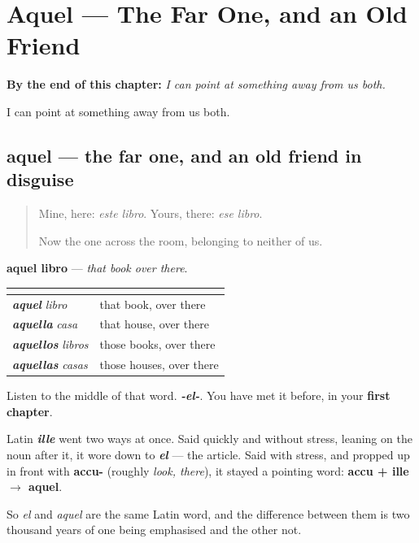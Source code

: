 
\chapter{Aquel --- The Far One, and an Old Friend}
\label{ch:aquel}

\begin{chapteropening}
\textbf{By the end of this chapter:} \emph{I can point at something away from us both.}

I can point at something away from us both.
\end{chapteropening}

\section[aquel]{aquel — the far one, and an old friend in disguise}

\label{lesson:ES-C59-aquel}



\begin{quote}
Mine, here: \emph{este libro}. Yours, there: \emph{ese libro}.

Now the one across the room, belonging to neither of us.
\end{quote}

\begin{cousinweb}
\textbf{aquel libro} — \emph{that book over there}.

\noindent
\begin{tabularx}{\linewidth}{@{}>{\raggedright\arraybackslash}X>{\raggedright\arraybackslash}X@{}}
\toprule
\textbf{} & \textbf{} \\
\midrule
\emph{\textbf{aquel}} \emph{libro} & that book, over there \\
\emph{\textbf{aquella}} \emph{casa} & that house, over there \\
\emph{\textbf{aquellos}} \emph{libros} & those books, over there \\
\emph{\textbf{aquellas}} \emph{casas} & those houses, over there \\
\bottomrule
\end{tabularx}

Listen to the middle of that word. \emph{\textbf{-el-}}. You have met it before, in your \textbf{first chapter}.

Latin \emph{\textbf{ille}} went two ways at once. Said quickly and without stress, leaning on the noun after it, it wore down to \emph{\textbf{el}} — the article. Said with stress, and propped up in front with \textbf{accu-} (roughly \emph{look, there}), it stayed a pointing word: \textbf{accu + ille $\to$ aquel}.

So \emph{el} and \emph{aquel} are the same Latin word, and the difference between them is two thousand years of one being emphasised and the other not.
\end{cousinweb}

